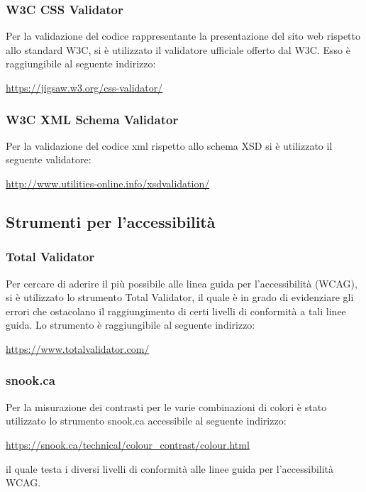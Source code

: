 		\subsubsection{W3C CSS Validator}		
		Per la validazione del codice rappresentante la presentazione del sito web rispetto allo standard W3C, si è utilizzato il validatore ufficiale offerto dal W3C. Esso è raggiungibile al seguente indirizzo:
		\begin{center}
			\url{https://jigsaw.w3.org/css-validator/}
		\end{center}
		\subsubsection{W3C XML Schema Validator}
		Per la validazione del codice xml rispetto allo schema XSD si è utilizzato il seguente validatore:
		\begin{center}
			\url{http://www.utilities-online.info/xsdvalidation/}
		\end{center}
	\subsection{Strumenti per l'accessibilità}
	
		\subsubsection{Total Validator}
		Per cercare di aderire il più possibile alle linea guida per l'accessibilità (WCAG), si è utilizzato lo strumento Total Validator, il quale è in grado di evidenziare gli errori che ostacolano il raggiungimento di certi livelli di conformità a tali linee guida. Lo strumento è raggiungibile al seguente indirizzo:
		\begin{center}
			\url{https://www.totalvalidator.com/}
		\end{center}
		
		\subsubsection{snook.ca}
		Per la misurazione dei contrasti per le varie combinazioni di colori è stato utilizzato lo strumento snook.ca accessibile al seguente indirizzo:
		\begin{center}
			\url{https://snook.ca/technical/colour_contrast/colour.html}
		\end{center}
		il quale testa i diversi livelli di conformità alle linee guida per l'accessibilità WCAG.
		
